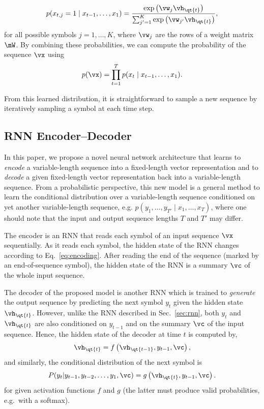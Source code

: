 \begin{align}
    \label{eq:softmax}
    p(x_{t,j} = 1 \mid x_{t-1}, \dots, x_1) = \frac{\exp \left(
        \vw_j \vh_{\qt{t}}\right) } {\sum_{j'=1}^{K} \exp \left( \vw_{j'}
        \vh_{\qt{t}}\right) },
\end{align}
for all possible symbols $j=1,\dots,K$, where $\vw_j$ are the rows of a
weight matrix $\mW$. By combining these probabilities,
we can compute the probability of the sequence $\vx$ using
\begin{align}
    \label{eq:distribution}
    p(\vx) = \prod_{t=1}^T p(x_t \mid x_{t-1}, \dots, x_1).
\end{align}

From this learned distribution, it is straightforward to sample a new sequence
by iteratively sampling a symbol at each time step.

\subsection{RNN Encoder--Decoder}
\label{sec:encdec}

In this paper, we propose a novel neural network architecture that learns to
\textit{encode} a variable-length sequence into a fixed-length vector
representation and to \textit{decode} a given fixed-length vector representation
back into a variable-length sequence. From a probabilistic perspective, this
new model is a general method to learn the conditional distribution over a
variable-length sequence conditioned on yet another variable-length sequence,
e.g. $p(y_1, \dots, y_{T'} \mid x_1, \dots, x_T)$, where one should note that
the input and output sequence lengths $T$ and $T'$ may differ.

The encoder is an RNN that reads each symbol of an input sequence $\vx$
sequentially. As it reads each symbol, the hidden state of the RNN changes
according to Eq.~\eqref{eq:encoding}. After reading the end of the sequence
(marked by an end-of-sequence symbol), the hidden state of the RNN is a summary
$\vc$ of the whole input sequence.

The decoder of the proposed model is another RNN which is trained to
\textit{generate} the output sequence by predicting the next symbol $y_t$ given
the hidden state $\vh_{\qt{t}}$. However, unlike the RNN described in
Sec.~\mbox{\ref{sec:rnn}}, both $y_t$ and $\vh_{\qt{t}}$ are also conditioned on $y_{t-1}$
and on the summary $\vc$ of the input sequence.
Hence, the hidden state of the decoder at time
$t$ is computed by,
\begin{align*}
    \vh_{\qt{t}} = f\left( \vh_{\qt{t-1}}, y_{t-1}, \vc \right),
\end{align*}
and similarly, the conditional distribution of the next symbol is
\begin{align*}
    P(y_t | y_{t-1}, y_{t-2}, \ldots, y_1, \vc) = g\left(\vh_{\qt{t}}, y_{t-1}, \vc \right).
\end{align*}
for given activation functions $f$ and $g$ (the latter must produce valid probabilities,
e.g.\ with a softmax).

